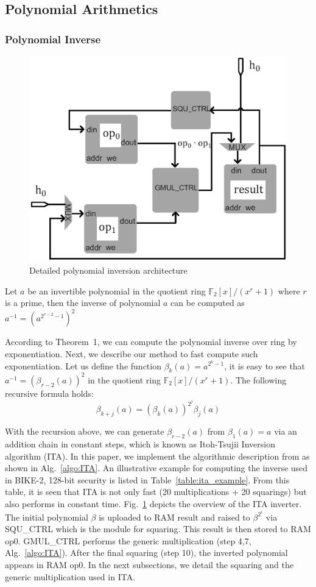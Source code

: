 \documentclass[preprint]{iacrtrans}
\begin{document}
\subsection{Polynomial Arithmetics}
\subsubsection{Polynomial Inverse}
\begin{figure}[!tb]
\centering
\includegraphics[width=.55\textwidth]{./fig/inv_unit.eps}
\caption{Detailed polynomial inversion architecture}\label{fig:inverter}
\end{figure}

\begin{theorem}
Let $a$ be an invertible polynomial in the quotient ring $\mathbb{F}_2[x]/(x^r+1)$ where $r$ is a prime, then the inverse of polynomial $a$ can be computed as $a^{-1}=(a^{2^{r-2}-1})^2$
\end{theorem}

According to Theorem~1, we can compute the polynomial inverse over ring by exponentiation. Next, we describe our method to fast compute such exponentiation. Let us define the function $\beta_{k}(a)=a^{2^k-1}$, it is easy to see that $a^{-1}=(\beta_{r-2}(a))^2$ in the quotient ring $\mathbb{F}_2[x]/(x^r+1)$. The following recursive
formula holds:
\[
    \beta_{k+j}(a)=(\beta_{k}(a))^{2^j}\beta_{j}(a)
\]

With the recursion above, we can generate $\beta_{r-2}(a)$ from $\beta_{1}(a)=a$ via an addition chain in constant steps, which is known as Itoh-Tsujii Inversion algorithm (ITA). In this paper, we implement the algorithmic description from \cite{hu2015fast} as shown in Alg.~\ref{algo:ITA}. An illustrative example for computing the inverse used in BIKE-2, 128-bit security is listed in Table~\ref{table:ita_example}. From this table, it is seen that ITA is not only fast (20 multiplications + 20 squarings) but also performs in constant time. Fig.~\ref{fig:inverter} depicts the overview of the ITA inverter. The initial polynomial $\beta$ is uploaded to RAM result and raised to ${\beta}^{2^t}$ via SQU\_CTRL which is the module for squaring. This result is then stored to RAM op0. GMUL\_CTRL performs the generic multiplication (step 4,7, Alg.~\ref{algo:ITA}). After the final squaring (step 10), the inverted polynomial appears in RAM op0. In the next subsections, we detail the squaring and the generic multiplication used in ITA.
\end{document}
